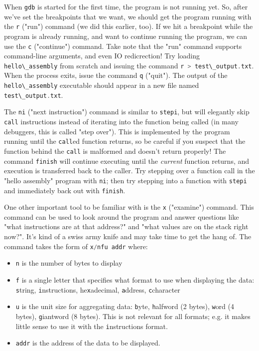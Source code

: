 \documentclass{article}
\newcommand{\xcode}[2]{\colorbox{ubuntuback}{\lstinline[language=#1]|#2|}}
\newcommand{\code}[1]{\colorbox{ubuntuback}{\texttt{#1}}}
\newcommand{\gdb}[1]{\xcode{C}{#1}}
\begin{document}
When \gdb{gdb} is started for the first time, the program is not running yet. So, after we've set the breakpoints that we want, we should get the program running with the \gdb{r} ("run") command (we did this earlier, too). If we hit a breakpoint while the program is already running, and want to continue running the program, we can use the \gdb{c} ("continue") command. Take note that the "run" command supports command-line arguments, and even IO redicrection! Try loading \gdb{hello\_assembly} from scratch and issuing the command \gdb{r > test\_output.txt}. When the process exits, issue the command \gdb{q} ("quit"). The output of the \gdb{hello\_assembly} executable should appear in a new file named \gdb{test\_output.txt}. 

The \gdb{ni} ("next instruction") command is similar to \gdb{stepi}, but will elegantly skip \gdb{call} instructions instead of iterating into the function being called (in many debuggers, this is called "step over"). This is implemented by the program running until the \code{call}ed function returns, so be careful if you suspect that the function behind the \code{call} is malformed and doesn't return properly! The command \gdb{finish} will continue executing until the \textit{current} function returns, and execution is transferred back to the caller. Try stepping over a function call in the "hello assembly" program with \gdb{ni}; then try stepping into a function with \gdb{stepi} and immediately back out with \gdb{finish}.

One other important tool to be familiar with is the \gdb{x} ("examine") command. This command can be used to look around the program and answer questions like "what instructions are at that address?" and "what values are on the stack right now?". It's kind of a swiss army knife and may take time to get the hang of. The command takes the form of \gdb{x/nfu addr} where:
\begin{itemize}
    \item \gdb{n} is the number of bytes to display
    \item \gdb{f} is a single letter that specifies what format to use when displaying the data: \gdb{s}tring, \gdb{i}nstructions, he\gdb{x}adecimal, \gdb{a}ddress, \gdb{c}character
    \item \gdb{u} is the unit size for aggregating data: \gdb{b}yte, \gdb{h}alfword (2 bytes), \gdb{w}ord (4 bytes), \gdb{g}iantword (8 bytes). This is not relevant for all formats; e.g. it makes little sense to use it with the \gdb{i}nstructions format.
    \item \gdb{addr} is the address of the data to be displayed.
\end{itemize}
\end{document}
